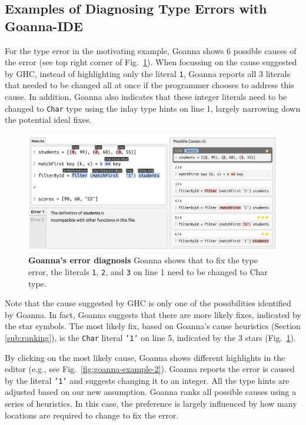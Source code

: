 \documentclass[pdflatex,lineno,sn-nature,Numbered]{sn-jnl}%
\begin{document}
    \subsection{Examples of Diagnosing Type Errors with Goanna-IDE}

    For the type error in the motivating example, Goanna shows 6 possible causes of the error (see top right corner of Fig.~\ref{fig:goanna-example-1}). When focussing on the cause suggested by GHC, instead of highlighting only the literal \texttt{1}, Goanna reports all 3 literals that needed to be changed all at once if the programmer chooses to address this cause. In addition, Goanna also indicates that these integer literals need to be changed to \texttt{Char} type using the inlay type hints on line 1, largely narrowing down the potential ideal fixes. 

    \begin{figure}[ht!]
        \centering
        \includegraphics[width=\linewidth]{images/Goanna-Example-1}
        \caption[Goanna's showing possible causes of a type error (1)]{\textbf{Goanna's error diagnosis} Goanna shows that to fix the type error, the literals \texttt{1}, \texttt{2}, and \texttt{3} on line 1 need to be changed to Char type.}
        \label{fig:goanna-example-1}
    \end{figure}

    Note that the cause suggested by GHC is only one of the possibilities identified by Goanna. In fact, Goanna suggests that there are more likely fixes, indicated by the star symbols. The most likely fix, based on Goanna's cause heuristics (Section \ref{sub:ranking}), is the \texttt{Char} literal \texttt{'1'} on line 5, indicated by the 3 stars (Fig.~\ref{fig:goanna-example-1}).
    
    By clicking on the most likely cause, Goanna shows different highlights in the editor (e.g., see Fig.~\ref{fig:goanna-example-2}). Goanna reports the error is caused by the literal \texttt{'1'} and suggests changing it to an integer. All the type hints are adjusted based on our new assumption. Goanna ranks all possible causes using a series of heuristics. In this case, the preference is largely influenced by how many locations are required to change to fix the error. 
    
\end{document}
